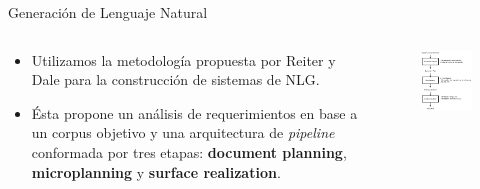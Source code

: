 \documentclass[pdf]{beamer}
\begin{document}
\begin{frame}{Generación de Lenguaje Natural}{}
\begin{columns}[t] %
\begin{column}{.60\textwidth}
  \begin{itemize}
  
    \item Utilizamos la metodología propuesta por Reiter y Dale para la construcción de sistemas de NLG.

    \item Ésta propone un análisis de requerimientos en base a un corpus objetivo y una arquitectura de \emph{pipeline} conformada por tres etapas: \textbf{document planning}, \textbf{microplanning} y \textbf{surface realization}.

  \end{itemize}
\end{column}%
\hfill%
\begin{column}{.40\textwidth}
  \begin{figure}[H]
    \centering
    \includegraphics[scale=0.3]{img/arquitectura.png}
  \end{figure}
\end{column}%
\end{columns}
\end{frame}
                                
\end{document}
